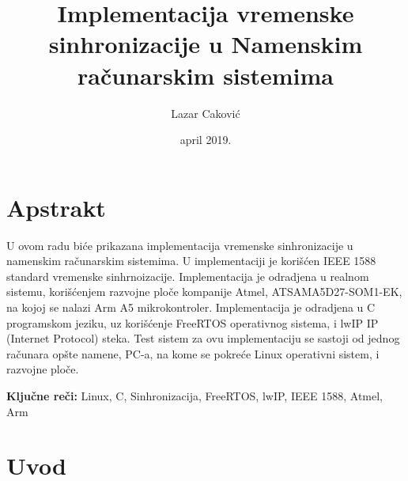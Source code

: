 \documentclass[a4paper,12pt, master]{etf}
\title{Implementacija vremenske sinhronizacije u Namenskim ra\v{c}unarskim sistemima}
\author{Lazar Caković}
\date{april 2019.}
\begin{document}
	\maketitle

	\tableofcontents

	\listoffigures

	\newpage

	\chapter*{Apstrakt}

    U ovom radu bi\'{c}e prikazana implementacija vremenske sinhronizacije u
	namenskim ra\v{c}unarskim sistemima. U implementaciji je kori\v{s}\'{c}en
	IEEE 1588 standard vremenske sinhrnoizacije. Implementacija je odradjena u
	realnom sistemu, kori\v{s}\'{c}enjem razvojne plo\v{c}e kompanije Atmel,
	ATSAMA5D27-SOM1-EK, na kojoj se nalazi Arm A5 mikrokontroler.
	Implementacija je odradjena u C programskom jeziku, uz kori\v{s}\'{c}enje
	FreeRTOS operativnog sistema, i lwIP IP (Internet Protocol) steka. Test
	sistem za ovu implementaciju se sastoji od jednog ra\v{c}unara op\v{s}te
	namene, PC-a, na kome se pokre\'{c}e Linux operativni sistem, i razvojne
	plo\v{c}e.

	\vspace{2cm}

	\textbf{Klju\v{c}ne re\v{c}i:}
	Linux, C, Sinhronizacija, FreeRTOS, lwIP, IEEE 1588, Atmel, Arm

	\newpage

	\chapter*{Uvod}
\end{document}

